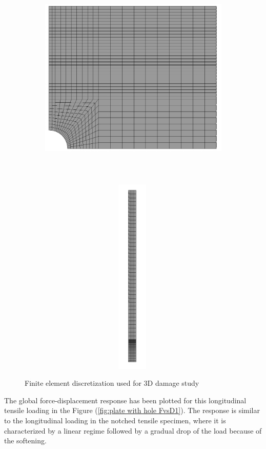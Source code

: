 \documentclass[a4paper,12pt,twoside]{report}
\begin{document}
\begin{figure}[htbp!]
	\centering
       \captionsetup[subfigure]{justification=centering}
     \begin{subfigure}{0.5\textwidth}
     	\centering
         \includegraphics[width=10cm,height=10cm,keepaspectratio]{27.Mesh.png}
         \label{fig:plate with hole mesh 1}
     \end{subfigure}
    \hspace{2.5cm}
     \captionsetup[subfigure]{justification=centering}
     \begin{subfigure}{0.3\textwidth}
     \centering
         \includegraphics[width=9cm,height=9.5cm,keepaspectratio]{27.Mesh2.png}
         \label{fig:plate with hole mesh 2}
         \end{subfigure}
          \caption{Finite element discretization used for 3D damage study}
        \label{fig:plate with hole mesh} 
\end{figure}
\FloatBarrier 
\indent\indent\indent The global force-displacement response has been plotted for this longitudinal tensile loading in the Figure (\ref{fig:plate with hole FvsD1}). The response is similar to the longitudinal loading in the notched tensile specimen, where it is characterized by a linear regime followed by a gradual drop of the load because of the softening.
 
\end{document}
